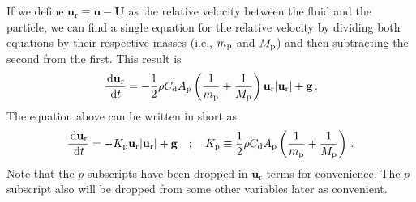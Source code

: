 If we define $\mathbf{u}_\text{r} \equiv \mathbf{u} - \mathbf{U}$ as the relative velocity between the fluid and the particle, we can find a single equation for the relative velocity by dividing both equations by their respective masses (i.e., $m_{\rm p}$ and $M_{\rm p}$) and then subtracting the second from the first. This result is
\begin{align}
    \frac{\,\mathrm{d} \mathbf{u}_\text{r}}{\,\mathrm{d} t} = -\frac{1}{2} \rho C_\text{d} A_{\rm p} \left(\frac{1}{m_{\rm p}} + \frac{1}{M_{\rm p}} \right) \mathbf{u}_\text{r} |\mathbf{u}_\text{r}| + \mathbf{g} \,.
\end{align}
The equation above can be written in short as
\begin{align}
    \frac{\,\mathrm{d} \mathbf{u}_\text{r}}{\,\mathrm{d} t} = -K_{\rm p} \mathbf{u}_\text{r} |\mathbf{u}_\text{r}| + \mathbf{g} \quad ; \quad K_{\rm p} \equiv \frac{1}{2} \rho C_\text{d} A_{\rm p} \left(\frac{1}{m_{\rm p}} + \frac{1}{M_{\rm p}} \right) \,.
\end{align}
Note that the $p$ subscripts have been dropped in $\mathbf{u}_\text{r}$ terms for convenience. The $p$ subscript also will be dropped from some other variables later as convenient.

